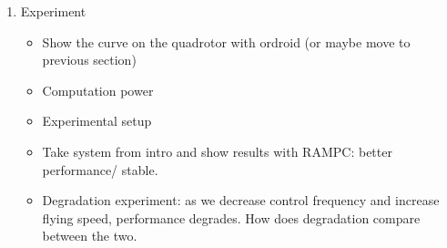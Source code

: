 \begin{enumerate}
	
	\item Experiment
	\begin{itemize}
			\item Show the curve on the quadrotor with ordroid (or maybe move to previous section)
			\item Computation power
			\item Experimental setup
			\item Take system from intro and show results with RAMPC: better performance/ stable.
			\item Degradation experiment: as we decrease control frequency and increase flying speed, performance degrades. How does degradation compare between the two.
			
	\end{itemize}

\end{enumerate}